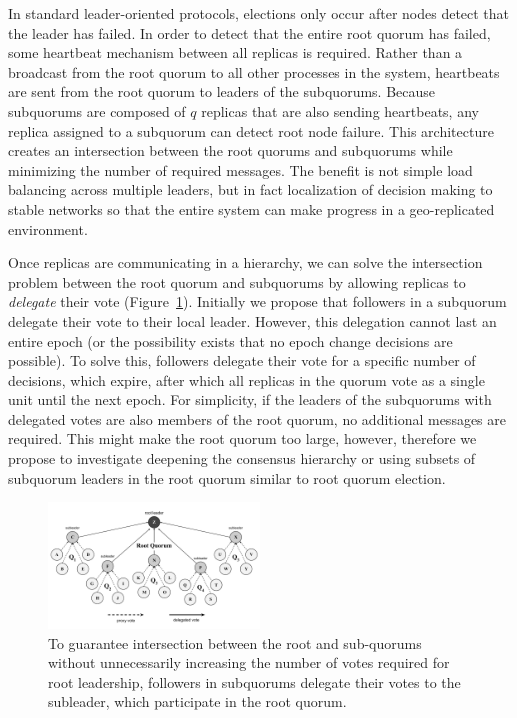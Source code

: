 \documentclass[sigconf]{acmart}
\begin{document}
In standard leader-oriented protocols, elections only occur after nodes detect that the
leader has failed.
In order to detect that the entire root quorum has failed, some heartbeat mechanism
between all replicas is required.
Rather than a broadcast from the root quorum to all other processes in the system,
heartbeats are sent from the root quorum to leaders of the subquorums.
Because subquorums are composed of $q$ replicas that are also sending heartbeats, any
replica assigned to a subquorum can detect root node failure.
This architecture creates an intersection between the root quorums and subquorums while
minimizing the number of required messages.
The benefit is not simple load balancing across multiple leaders, but in fact
localization of decision making to stable networks so that the entire system can make
progress in a geo-replicated environment.

Once replicas are communicating in a hierarchy, we can solve the intersection problem
between the root quorum and subquorums by allowing replicas to \emph{delegate} their
vote (Figure~\ref{fig:delegates}).
Initially we propose that followers in a subquorum delegate their vote to their local
leader.
However, this delegation cannot last an entire epoch (or the possibility exists that no
epoch change decisions are possible).
To solve this, followers delegate their vote for a specific number of decisions, which
expire, after which all replicas in the quorum vote as a single unit until the next
epoch.
For simplicity, if the leaders of the subquorums with delegated votes are also members of
the root quorum, no additional messages are required.
This might make the root quorum too large, however, therefore we propose to investigate
deepening the consensus hierarchy or using subsets of subquorum leaders in the root
quorum similar to root quorum election.

\begin{figure}[t]
    \centering
    \includegraphics[width=0.5\textwidth]{figures/delegates}
    \caption{To guarantee intersection between the root and sub-quorums without unnecessarily increasing the number of votes required for root leadership, followers in subquorums delegate their votes to the subleader, which participate in the root quorum.}
    \label{fig:delegates}
\end{figure}
\end{document}
